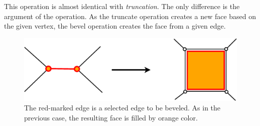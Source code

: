 This operation is almost identical with \emph{truncation}. The only difference is the argument of the
operation. As the truncate operation creates a new face based on the given vertex, the bevel operation
creates the face from a given edge.\\

\begin{figure}[ht]
\centering
\includegraphics[scale=0.2]{../img/bevel.eps}
\caption{The red-marked edge is a selected edge to be beveled. As in the previous case, the resulting
face is filled by orange color.}
\end{figure}


